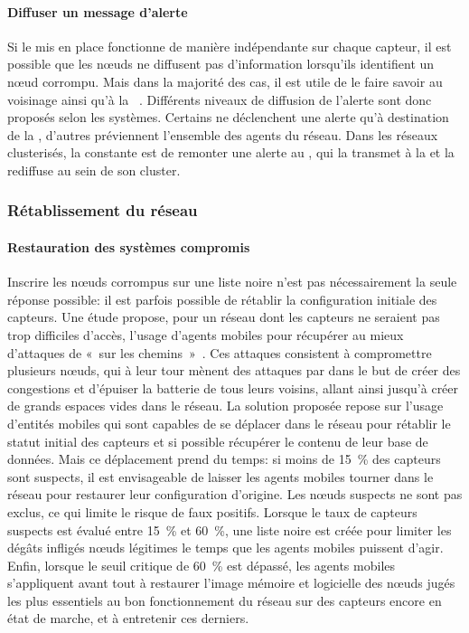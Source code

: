         \paragraph{Diffuser un message d'alerte}
Si le \ids mis en place fonctionne de manière indépendante sur chaque capteur, il est possible que les nœuds ne diffusent pas d'information lorsqu'ils identifient un nœud corrompu.
Mais dans la majorité des cas, il est utile de le faire savoir au voisinage ainsi qu'à la \sdb~\cite{BMS13}.
Différents niveaux de diffusion de l'alerte sont donc proposés selon les systèmes.
Certains ne déclenchent une alerte qu'à destination de la \sdb, d'autres préviennent l'ensemble des agents du réseau.
Dans les réseaux clusterisés, la constante est de remonter une alerte au \ch, qui la transmet à la \sdb et la rediffuse au sein de son cluster.

    \subsubsection{Rétablissement du réseau}
        \paragraph{Restauration des systèmes compromis}
Inscrire les nœuds corrompus sur une liste noire n'est pas nécessairement la seule réponse possible: il est parfois possible de rétablir la configuration initiale des capteurs.
Une étude propose, pour un réseau dont les capteurs ne seraient pas trop difficiles d'accès, l'usage d'agents mobiles pour récupérer au mieux d'attaques de \dds « sur les chemins »~\cite{LB09}.
Ces attaques consistent à compromettre plusieurs nœuds, qui à leur tour mènent des attaques par \deluge dans le but de créer des congestions et d'épuiser la batterie de tous leurs voisins, allant ainsi jusqu'à créer de grands espaces vides dans le réseau.
La solution proposée repose sur l'usage d'entités mobiles qui sont capables de se déplacer dans le réseau pour rétablir le statut initial des capteurs et si possible récupérer le contenu de leur base de données.
Mais ce déplacement prend du temps: si moins de 15~\% des capteurs sont suspects, il est envisageable de laisser les agents mobiles tourner dans le réseau pour restaurer leur configuration d'origine.
Les nœuds suspects ne sont pas exclus, ce qui limite le risque de faux positifs.
Lorsque le taux de capteurs suspects est évalué entre 15~\% et 60~\%, une liste noire est créée pour limiter les dégâts infligés nœuds légitimes le temps que les agents mobiles puissent d'agir.
Enfin, lorsque le seuil critique de 60~\% est dépassé, les agents mobiles s'appliquent avant tout à restaurer l'image mémoire et logicielle des nœuds jugés les plus essentiels au bon fonctionnement du réseau sur des capteurs encore en état de marche, et à entretenir ces derniers.


